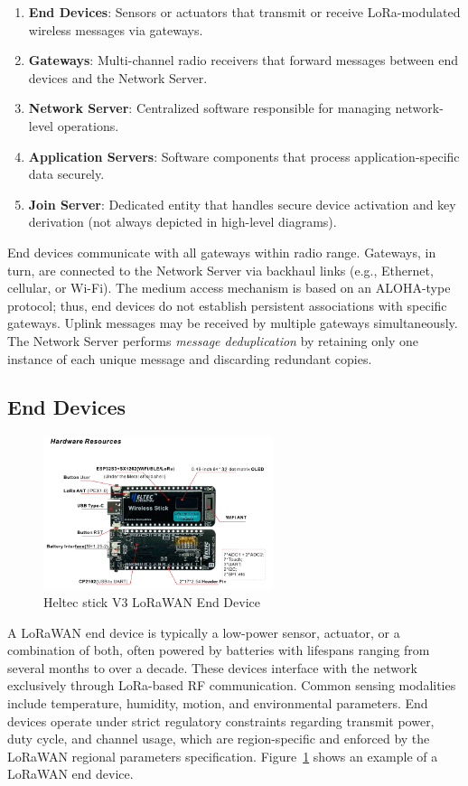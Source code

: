 \begin{enumerate}
    \item \textbf{End Devices}: Sensors or actuators that transmit or receive LoRa-modulated wireless messages via gateways.
    \item \textbf{Gateways}: Multi-channel radio receivers that forward messages between end devices and the Network Server.
    \item \textbf{Network Server}: Centralized software responsible for managing network-level operations.
    \item \textbf{Application Servers}: Software components that process application-specific data securely.
    \item \textbf{Join Server}: Dedicated entity that handles secure device activation and key derivation (not always depicted in high-level diagrams).
\end{enumerate}

End devices communicate with all gateways within radio range. Gateways, in turn, are connected to the Network Server via backhaul links (e.g., Ethernet, cellular, or Wi-Fi). The medium access mechanism is based on an ALOHA-type protocol; thus, end devices do not establish persistent associations with specific gateways. Uplink messages may be received by multiple gateways simultaneously. The Network Server performs \emph{message deduplication} by retaining only one instance of each unique message and discarding redundant copies.

\subsection{End Devices}
\begin{figure}
    \centering
    \includegraphics[width=0.6\textwidth]{figures/stick_v3.png}
    \caption{Heltec stick V3 LoRaWAN End Device}
    \label{fig:lora_end_device}
\end{figure}

A LoRaWAN end device is typically a low-power sensor, actuator, or a combination of both, often powered by batteries with lifespans ranging from several months to over a decade. These devices interface with the network exclusively through LoRa-based RF communication. Common sensing modalities include temperature, humidity, motion, and environmental parameters. End devices operate under strict regulatory constraints regarding transmit power, duty cycle, and channel usage, which are region-specific and enforced by the LoRaWAN regional parameters specification.
Figure~\ref{fig:lora_end_device} shows an example of a LoRaWAN end device.

